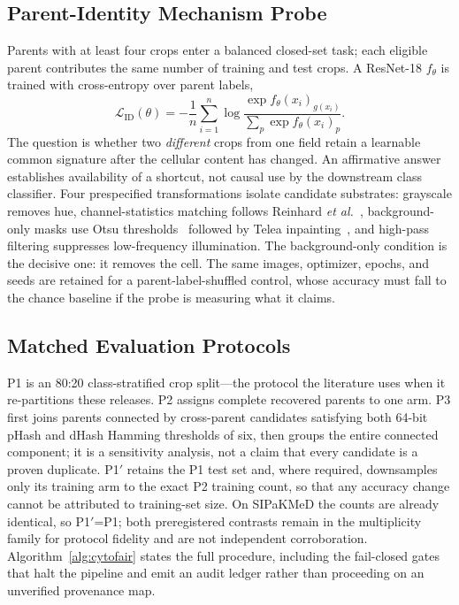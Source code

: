 \documentclass[conference]{IEEEtran}
\newcommand{\protocol}[1]{\textsf{#1}}
\begin{document}
\subsection{Parent-Identity Mechanism Probe}
\label{sec:probe}
Parents with at least four crops enter a balanced closed-set task; each eligible parent contributes the same number of training and test crops.
A ResNet-18 $f_\theta$ is trained with cross-entropy over parent labels,
\begin{equation}
\mathcal{L}_{\mathrm{ID}}(\theta)=-\frac{1}{n}\sum_{i=1}^{n}
\log \frac{\exp f_\theta(x_i)_{g(x_i)}}{\sum_{p}\exp f_\theta(x_i)_p}.
\label{eq:probe}
\end{equation}
The question is whether two \emph{different} crops from one field retain a learnable common signature after the cellular content has changed.
An affirmative answer establishes availability of a shortcut, not causal use by the downstream class classifier.
Four prespecified transformations isolate candidate substrates: grayscale removes hue, channel-statistics matching follows Reinhard \emph{et al.}~\cite{reinhard2001color}, background-only masks use Otsu thresholds~\cite{otsu1979threshold} followed by Telea inpainting~\cite{telea2004inpainting}, and high-pass filtering suppresses low-frequency illumination.
The background-only condition is the decisive one: it removes the cell.
The same images, optimizer, epochs, and seeds are retained for a parent-label-shuffled control, whose accuracy must fall to the chance baseline if the probe is measuring what it claims.

\subsection{Matched Evaluation Protocols}
\protocol{P1} is an 80:20 class-stratified crop split---the protocol the literature uses when it re-partitions these releases.
\protocol{P2} assigns complete recovered parents to one arm.
\protocol{P3} first joins parents connected by cross-parent candidates satisfying both 64-bit pHash and dHash Hamming thresholds of six, then groups the entire connected component; it is a sensitivity analysis, not a claim that every candidate is a proven duplicate.
\protocol{P1$'$} retains the \protocol{P1} test set and, where required, downsamples only its training arm to the exact \protocol{P2} training count, so that any accuracy change cannot be attributed to training-set size.
On SIPaKMeD the counts are already identical, so \protocol{P1$'$}=\protocol{P1}; both preregistered contrasts remain in the multiplicity family for protocol fidelity and are not independent corroboration.
Algorithm~\ref{alg:cytofair} states the full procedure, including the fail-closed gates that halt the pipeline and emit an audit ledger rather than proceeding on an unverified provenance map.
\end{document}
